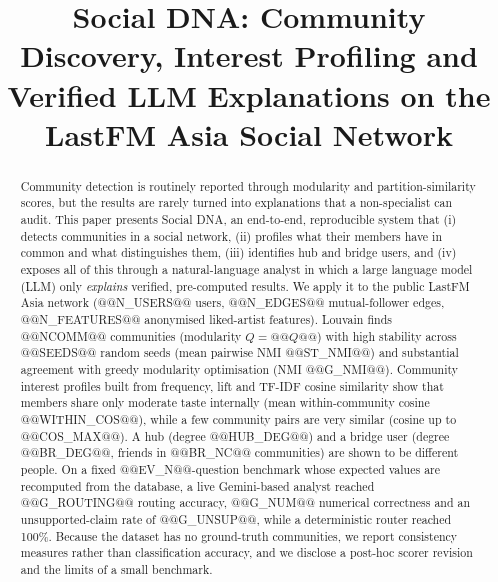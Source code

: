 \documentclass[conference]{IEEEtran}
\begin{document}
\title{Social DNA: Community Discovery, Interest Profiling and Verified LLM Explanations on the LastFM Asia Social Network}

\author{
}

\maketitle

\begin{abstract}
Community detection is routinely reported through modularity and partition-similarity scores, but the results are rarely turned into explanations that a non-specialist can audit. This paper presents Social DNA, an end-to-end, reproducible system that (i) detects communities in a social network, (ii) profiles what their members have in common and what distinguishes them, (iii) identifies hub and bridge users, and (iv) exposes all of this through a natural-language analyst in which a large language model (LLM) only \emph{explains} verified, pre-computed results. We apply it to the public LastFM Asia network (@@N_USERS@@ users, @@N_EDGES@@ mutual-follower edges, @@N_FEATURES@@ anonymised liked-artist features). Louvain finds @@NCOMM@@ communities (modularity $Q=@@Q@@$) with high stability across @@SEEDS@@ random seeds (mean pairwise NMI @@ST_NMI@@) and substantial agreement with greedy modularity optimisation (NMI @@G_NMI@@). Community interest profiles built from frequency, lift and TF-IDF cosine similarity show that members share only moderate taste internally (mean within-community cosine @@WITHIN_COS@@), while a few community pairs are very similar (cosine up to @@COS_MAX@@). A hub (degree @@HUB_DEG@@) and a bridge user (degree @@BR_DEG@@, friends in @@BR_NC@@ communities) are shown to be different people. On a fixed @@EV_N@@-question benchmark whose expected values are recomputed from the database, a live Gemini-based analyst reached @@G_ROUTING@@ routing accuracy, @@G_NUM@@ numerical correctness and an unsupported-claim rate of @@G_UNSUP@@, while a deterministic router reached 100\%. Because the dataset has no ground-truth communities, we report consistency measures rather than classification accuracy, and we disclose a post-hoc scorer revision and the limits of a small benchmark.
\end{abstract}
\end{document}
